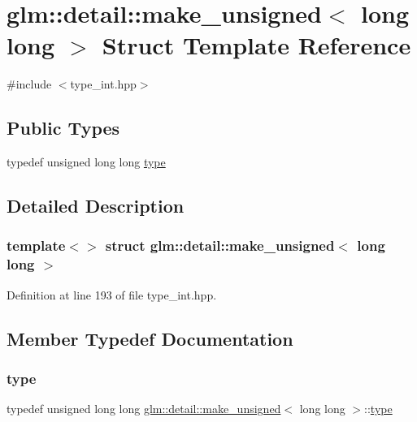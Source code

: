\hypertarget{structglm_1_1detail_1_1make__unsigned_3_01long_01long_01_4}{}\section{glm\+::detail\+::make\+\_\+unsigned$<$ long long $>$ Struct Template Reference}
\label{structglm_1_1detail_1_1make__unsigned_3_01long_01long_01_4}


{\ttfamily \#include $<$type\+\_\+int.\+hpp$>$}

\subsection*{Public Types}
\begin{DoxyCompactItemize}
\item 
typedef unsigned long long \mbox{\hyperlink{structglm_1_1detail_1_1make__unsigned_3_01long_01long_01_4_adb9a738bcdd4b53058383168bb8585b1}{type}}
\end{DoxyCompactItemize}


\subsection{Detailed Description}
\subsubsection*{template$<$$>$\newline
struct glm\+::detail\+::make\+\_\+unsigned$<$ long long $>$}



Definition at line 193 of file type\+\_\+int.\+hpp.



\subsection{Member Typedef Documentation}
\mbox{\label{structglm_1_1detail_1_1make__unsigned_3_01long_01long_01_4_adb9a738bcdd4b53058383168bb8585b1}} 
\subsubsection{\texorpdfstring{type}{type}}
{\footnotesize\ttfamily typedef unsigned long long \mbox{\hyperlink{structglm_1_1detail_1_1make__unsigned}{glm\+::detail\+::make\+\_\+unsigned}}$<$ long long $>$\+::\mbox{\hyperlink{structglm_1_1detail_1_1make__unsigned_3_01long_01long_01_4_adb9a738bcdd4b53058383168bb8585b1}{type}}}



